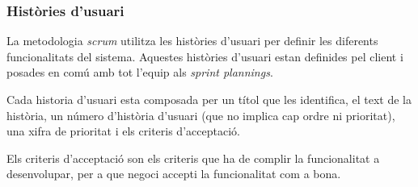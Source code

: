\subsubsection{Històries d'usuari}
\label{sec:histories_usuari}


La metodologia \textit{scrum} utilitza les històries d'usuari per definir les diferents funcionalitats del sistema. Aquestes històries d'usuari estan definides pel client i posades en comú amb tot l'equip als \textit{sprint plannings}.

Cada historia d'usuari esta composada per un títol que les identifica, el text de la història, un número d'història d'usuari (que no implica cap ordre ni prioritat), una xifra de prioritat i els criteris d'acceptació.

Els criteris d'acceptació son els criteris que ha de complir la funcionalitat a desenvolupar, per a que negoci accepti la funcionalitat com a bona.




\newcommand{\pintaHistoria}[4]{

    \label{sec:historia_\arabic{numeroHistoriaUsuari}}

    \begin{table}[ht]
        \setlength{\arrayrulewidth}{0.5mm}
        \arrayrulecolor{colorBorderHistories}
        \begin{tabularx}{\linewidth}{|l|l|}
            \hline
            \multicolumn{2}{|X|}{\large{\textbf{\arabic{numeroHistoriaUsuari}}. \textbf{#1}}} \\ \hline
            \multicolumn{2}{|X|}{#2} \\ \hline
            \cellcolor{colorCellHistories}\textbf{Prioritat:} & #3 \\ \hline
            \multicolumn{2}{|X|}{\cellcolor{colorCellHistories}\textbf{Criteris d'acceptació:}} \\ \hline
            \multicolumn{2}{|X|}{\begin{minipage}[t]{\linewidth}#4\end{minipage}} \\ \hline
            
        \end{tabularx}
    \end{table}

    \arrayrulecolor{colorBorderDefecte}

    \stepcounter{numeroHistoriaUsuari}
    \FloatBarrier
}


